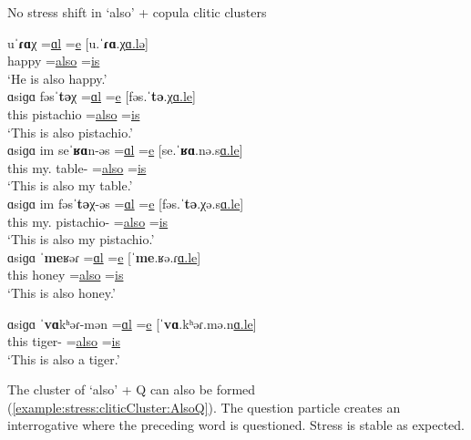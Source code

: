 \begin{exe}
	\ex No stress shift in `also' + copula   clitic clusters\label{example:stress:cliticCluster:AlsoCop}
	\begin{xlist}
		\ex \gll uˈ\textbf{ɾɑ}χ =\underline{ɑl} =\underline{e}   [u.ˈ\textbf{ɾɑ}.χ\underline{ɑ.lə}]
		\\
		happy =\underline{also} =\underline{is}
		\\
		\trans `He is also happy.'
		\\
		\ex \gll ɑsiɡɑ fəsˈ\textbf{tə}χ =\underline{ɑl} =\underline{e} [fəs.ˈ\textbf{tə}.χ\underline{ɑ.le}]
		\\
		this pistachio  =\underline{also}  =\underline{is}
		\\
		\trans `This is also pistachio.'
		\\
		\ex \gll ɑsiɡɑ im seˈ\textbf{ʁɑ}n-əs =\underline{ɑl} =\underline{e} [se.ˈ\textbf{ʁɑ}.nə.s\underline{ɑ.le}]
		\\
		this my.{\gen} table-{\possFsg} =\underline{also}  =\underline{is}
		\\
		\trans `This is also my table.'
		\\
		\ex \gll ɑsiɡɑ im fəsˈ\textbf{tə}χ-əs =\underline{ɑl} =\underline{e} [fəs.ˈ\textbf{tə}.χə.s\underline{ɑ.le}]
		\\
		this my.{\gen} pistachio-{\possFsg}  =\underline{also}  =\underline{is}
		\\
		\trans `This is also my pistachio.'
		\\
		\ex \gll ɑsiɡɑ ˈ\textbf{me}ʁəɾ =\underline{ɑl} =\underline{e} [ˈ\textbf{me}.ʁə.ɾ\underline{ɑ.le}]
		\\
		this honey  =\underline{also} =\underline{is}
		\\
		\trans `This is also honey.'
		\\
		
		\ex \gll ɑsiɡɑ ˈ\textbf{vɑ}kʰəɾ-mən =\underline{ɑl} =\underline{e} [ˈ\textbf{vɑ}.kʰəɾ.mə.n\underline{ɑ.le}]
		\\
		this tiger-{\indf}  =\underline{also} =\underline{is}
		\\
		\trans `This is also a tiger.'
		\\
	\end{xlist}
\end{exe}

The cluster of `also' + Q can also be formed (\ref{example:stress:cliticCluster:AlsoQ}).  The question particle creates an interrogative   where the preceding word is questioned.  Stress is stable as expected. 


